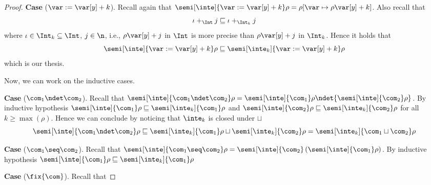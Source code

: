 \begin{proof}
  \medskip

  \noindent
  \textbf{Case} (\(\var := \var[y] + k\)).
  Recall again that
  \({\semi[\inte]{\var := \var[y] + k}\rho} = {\rho[\var \mapsto
    \rho\var[y] + k]}\). Also recall that
  \begin{equation*}
    \iota +_{\Int} j \sqsubseteq \iota +_{\Int_k} j
  \end{equation*}
  where \(\iota \in \Int_k \subseteq \Int\), \(j\in\n\), i.e.,
  \(\rho\var[y] + j\) in \(\Int\) is more precise than
  \(\rho\var[y] + j\) in \(\Int_k\). Hence it holds that
  \begin{equation*}
    {\semi[\inte]{\var := \var[y] + k}\rho} \sqsubseteq {\semi[\inte_k]{\var := \var[y] + k}\rho}
  \end{equation*}
  which is our thesis.

  \medskip
  \noindent
  Now, we can work on the inductive cases.

  \medskip

  \noindent
  \textbf{Case} (\(\com_1 \ndet \com_2\)).
  Recall that
  \({\semi[\inte]{\com_1 \ndet \com_2}\rho} = {\semi[\inte]{\com_1}\rho}
  \ndet {\semi[\inte]{\com_2}\rho}\). By inductive hypothesis
  \({\semi[\inte]{\com_1}\rho} \sqsubseteq
  {\semi[\inte_k]{\com_1}\rho}\) and
  \({\semi[\inte]{\com_2}\rho} \sqsubseteq
  {\semi[\inte_k]{\com_2}\rho}\) for all \(k \geq \max(\rho)\). Hence we
  can conclude by noticing that \(\inte_k\) is closed under \(\sqcup\)
  \begin{equation*}
    \semi[\inte]{\com_1 \ndet \com_2}\rho \sqsubseteq
    \semi[\inte_k]{\com_1}\rho \sqcup \semi[\inte_k]{\com_2}\rho =
    \semi[\inte_k]{\com_1 \sqcup \com_2}\rho
  \end{equation*}

  \medskip

  \noindent
  \textbf{Case} (\(\com_1 \seq \com_2\)).
  Recall that
  \({\semi[\inte]{\com_1 \seq \com_2}\rho} =
  {\semi[\inte]{\com_2}\left(\semi[\inte]{\com_1}\rho\right)}\). By
  inductive hypothesis
  \({\semi[\inte]{\com_1}\rho} \sqsubseteq
  {\semi[\inte_k]{\com_1}\rho}\)

  \medskip

  \noindent
  \textbf{Case} (\(\fix{\com}\)).
  Recall that

\end{proof}




